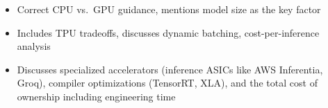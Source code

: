 \begin{interviewq}
\goodgreat
\begin{itemize}
    \item {} Correct CPU vs.\ GPU guidance, mentions model size as the key factor
    \item {} Includes TPU tradeoffs, discusses dynamic batching, cost-per-inference analysis
    \item {} Discusses specialized accelerators (inference ASICs like AWS Inferentia, Groq), compiler optimizations (TensorRT, XLA), and the total cost of ownership including engineering time
\end{itemize}

\end{interviewq}

